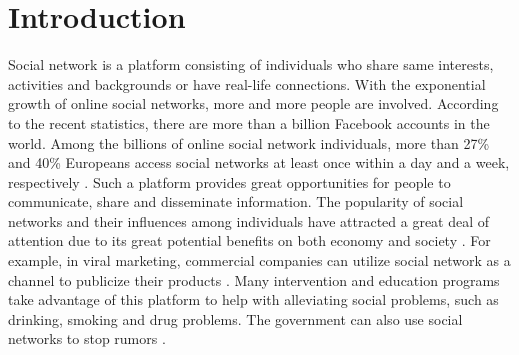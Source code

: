 \section{Introduction}
\label{intro}
Social network is a platform consisting of individuals who share same interests, activities and backgrounds or have real-life connections.
With the exponential growth of online social networks, more and more people are involved. According to the recent statistics, there are more than a billion Facebook accounts in the world.
Among the billions of online social network individuals, more than 27\% and 40\% Europeans access social networks at least once within a day and a week,
respectively \cite{Think2014}.
Such a platform provides great opportunities for people to communicate, share and disseminate information.
The popularity of social networks and their influences among individuals have attracted a great deal of attention due to its great
potential benefits on both economy and society \cite{ShiNew/WLZC2015}	 .
For example, in viral marketing, commercial companies can utilize social network as a channel to publicize their products \cite{ShiNew/WCDD2015}.
Many intervention and education programs take advantage of this platform to help with alleviating social problems, such as drinking, smoking and drug problems. The government can also use social networks to stop rumors \cite{ShiNew/HCW2015}\cite{ShiNew/WCGP2015} . 

